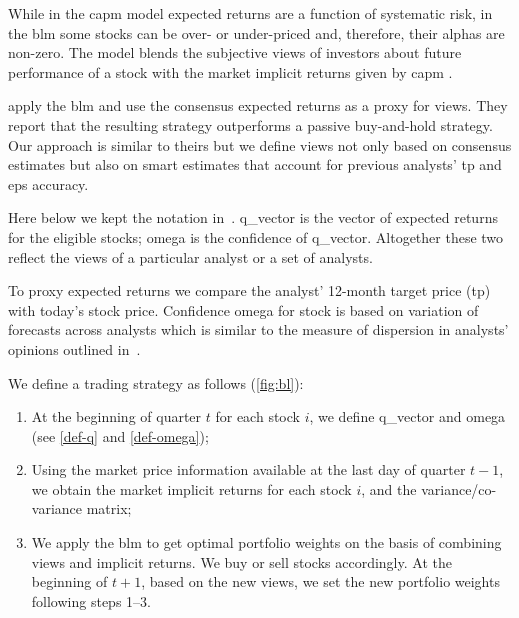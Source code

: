 \documentclass[a4paper,twoside,12pt,openright,notitlepage]{report}\usepackage[]{graphicx}\usepackage[]{color}
\begin{document}
While in the \gls{capm}  model expected returns are a function of systematic risk, in the \gls{blm} some stocks can be over- or under-priced and, therefore, their alphas are non-zero. The model blends the subjective views of investors about future performance of a stock with the market implicit returns given by \gls{capm} .

\cite{da2011bl} apply the \gls{blm} and use the consensus expected returns as a proxy for views. They report that the resulting strategy outperforms a passive buy-and-hold strategy. Our approach is similar to theirs but we define views not only based on consensus estimates but also on smart estimates that account for previous analysts' \gls{tp} and \gls{eps} accuracy.


Here below we kept the notation in~\cite{black1992}.  \gls{q_vector} is the vector of  expected returns for the eligible stocks; \gls{omega}  is the confidence of \gls{q_vector}. Altogether these two reflect the views of a particular analyst or a set of analysts.

To proxy expected returns we compare the analyst' 12-month target price (\gls{tp}) with today's stock price. Confidence \gls{omega} for stock is based on variation  of forecasts across analysts which is similar to the measure of dispersion in analysts' opinions outlined in~\cite{diether2002}.


We define a trading strategy as follows (\ref{fig:bl}):
\begin{enumerate}
\item  At the beginning of quarter $t$ for each stock $i$,   we define \gls{q_vector} and \gls{omega} (see \ref{def-q} and \ref{def-omega});

\item Using the market price information available at the last day of quarter $t-1$, we obtain the market implicit returns for each stock $i$,  and the variance/co-variance matrix;

\item We apply the \gls{blm} to get  optimal portfolio weights on the basis of combining views and implicit returns. We  buy or sell stocks accordingly. At the beginning of $t+1$, based on the new views, we set the new portfolio weights following  steps 1--3.
\end{enumerate}
\end{document}
